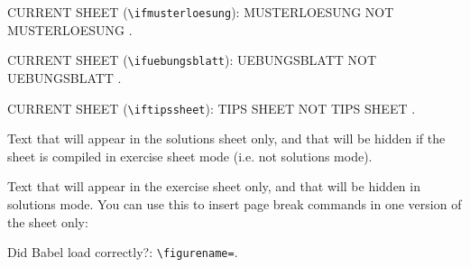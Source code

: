 \documentclass[11pt,a4paper]{article}
\begin{document}
CURRENT SHEET (\texttt{\textbackslash ifmusterloesung}):
\ifmusterloesung MUSTERLOESUNG \else NOT MUSTERLOESUNG \fi .

CURRENT SHEET (\texttt{\textbackslash ifuebungsblatt}):
\ifuebungsblatt UEBUNGSBLATT \else NOT UEBUNGSBLATT \fi .

CURRENT SHEET (\texttt{\textbackslash iftipssheet}):
\iftipssheet TIPS SHEET \else NOT TIPS SHEET \fi .

\begin{onlysolutions} %
Text that will appear in the solutions sheet only, and that will be hidden if the sheet is
compiled in exercise sheet mode (i.e. not solutions mode).
\end{onlysolutions}
\begin{onlyuebungsblatt} %
Text that will appear in the exercise sheet only, and that will be hidden in solutions
mode. You can use this to insert page break commands in one version of the sheet only:

\newpage
\end{onlyuebungsblatt}

Did Babel load correctly?: \texttt{\textbackslash figurename=}\figurename.
\end{document}
